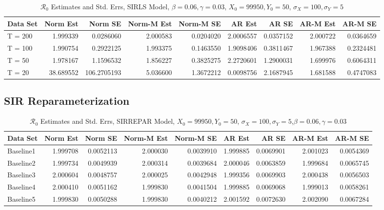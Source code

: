 \documentclass[12pt]{article}
\newcommand{\rr}{\ensuremath{\mathcal{R}_0}}
\begin{document}
\begin{table}[H]
	
	\caption{\label{tab:}$\rr$ Estimates and Std. Errs, SIRLS Model,
		$\beta = 0.06, \gamma = 0.03$, $X_0 = 99950, Y_0 = 50$, $\sigma_X = 100, \sigma_Y = 5$}
	\centering
	\begin{tabular}[t]{l|r|r|r|r|r|r|r|r}
		\hline
		Data Set & Norm Est & Norm SE & Norm-M Est & Norm-M SE & AR Est & AR SE & AR-M Est & AR-M SE\\
		\hline
		T = 200 & 1.999339 & 0.0286060 & 2.000583 & 0.0204020 & 2.0006557 & 0.0357152 & 2.000722 & 0.0364659\\
		\hline
		T = 100 & 1.990754 & 0.2922125 & 1.993375 & 0.1463550 & 1.9098406 & 0.3811467 & 1.967388 & 0.2324481\\
		\hline
		T = 50 & 1.978167 & 1.1596532 & 1.856227 & 0.3825275 & 2.2720601 & 1.2900031 & 1.699976 & 0.6064311\\
		\hline
		T = 20 & 38.689552 & 106.2705193 & 5.036600 & 1.3672212 & 0.0098756 & 2.1687945 & 1.681588 & 0.4747083\\
		\hline
	\end{tabular}
\end{table}

\subsection{SIR Reparameterization}

\begin{table}[H]
	
	\caption{\label{tab:}$\rr$ Estimates and Std. Errs, SIRREPAR Model,
		$X_0 = 99950, Y_0 = 50$, $\sigma_X = 100, \sigma_Y = 5$,$\beta = 0.06, \gamma = 0.03$}
	\centering
	\begin{footnotesize}
		\begin{tabular}[t]{l|r|r|r|r|r|r|r|r}
			\hline
			Data Set & Norm Est & Norm SE & Norm-M Est & Norm-M SE & AR Est & AR SE & AR-M Est & AR-M SE\\
			\hline
			Baseline1 & 1.999708 & 0.0052113 & 2.000030 & 0.0039910 & 1.999885 & 0.0069901 & 2.001023 & 0.0054369\\
			\hline
			Baseline2 & 1.999734 & 0.0049939 & 2.000314 & 0.0039684 & 2.000046 & 0.0063859 & 1.999684 & 0.0065745\\
			\hline
			Baseline3 & 2.000604 & 0.0048757 & 2.000025 & 0.0042948 & 1.999356 & 0.0069903 & 2.000438 & 0.0056503\\
			\hline
			Baseline4 & 2.000410 & 0.0051162 & 1.999830 & 0.0041504 & 1.999885 & 0.0069068 & 1.999013 & 0.0058261\\
			\hline
			Baseline5 & 1.999830 & 0.0050288 & 1.999830 & 0.0040212 & 2.001592 & 0.0072630 & 2.002090 & 0.0067284\\
			\hline
		\end{tabular}
	\end{footnotesize}
\end{table}
\end{document}
